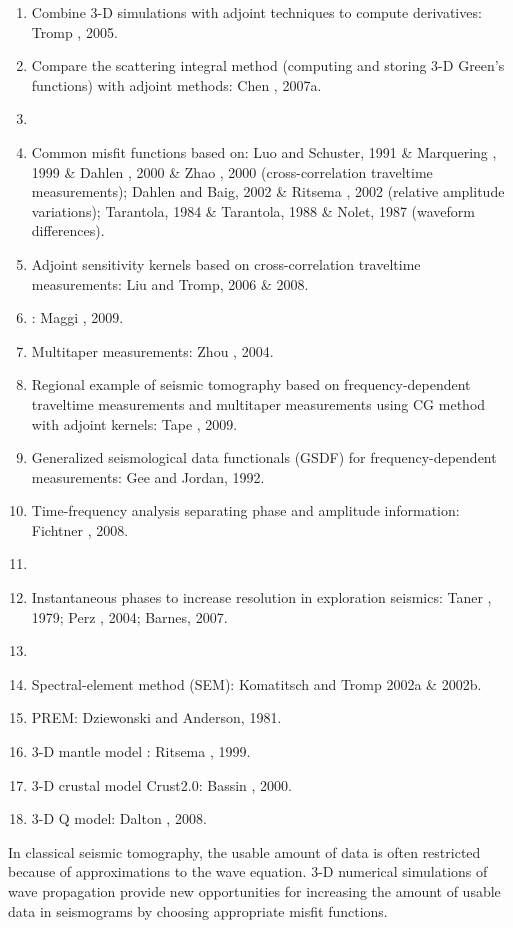 \begin{enumerate}[\hspace{10mm}*]
  \item Combine 3-D simulations with adjoint techniques to compute \Frechet derivatives: Tromp \etal, 2005.
  \item Compare the scattering integral method (computing and storing 3-D Green's functions) with adjoint methods: Chen \etal, 2007a.
  \item \sline
  \item Common misfit functions based on: Luo and Schuster, 1991 \& Marquering \etal, 1999 \& Dahlen \etal, 2000 \& Zhao \etal, 2000 (cross-correlation traveltime measurements); Dahlen and Baig, 2002 \& Ritsema \etal, 2002 (relative amplitude variations); Tarantola, 1984 \& Tarantola, 1988 \& Nolet, 1987 (waveform differences).
  \item Adjoint sensitivity kernels based on cross-correlation traveltime measurements: Liu and Tromp, 2006 \& 2008.
  \item {}: Maggi \etal, 2009.
  \item Multitaper measurements: Zhou \etal, 2004.
  \item Regional example of seismic tomography based on frequency-dependent traveltime measurements and multitaper measurements using CG method with adjoint kernels: Tape \etal, 2009.
  \item Generalized seismological data functionals (GSDF) for frequency-dependent measurements: Gee and Jordan, 1992.
  \item Time-frequency analysis separating phase and amplitude information: Fichtner \etal, 2008.
  \item \sline
  \item Instantaneous phases to increase resolution in exploration seismics: Taner \etal, 1979; Perz \etal, 2004; Barnes, 2007.
  \item \sline
  \item Spectral-element method (SEM): Komatitsch and Tromp 2002a \& 2002b.
  \item PREM: Dziewonski and Anderson, 1981.
  \item 3-D mantle model : Ritsema \etal, 1999.
  \item 3-D crustal model Crust2.0: Bassin \etal, 2000.
  \item 3-D Q model: Dalton \etal, 2008.
\end{enumerate}\par
{} In classical seismic tomography, the usable amount of data is often restricted because of approximations to the wave equation. 3-D numerical simulations of wave propagation provide new opportunities for increasing the amount of usable data in seismograms by choosing appropriate misfit functions.\par
